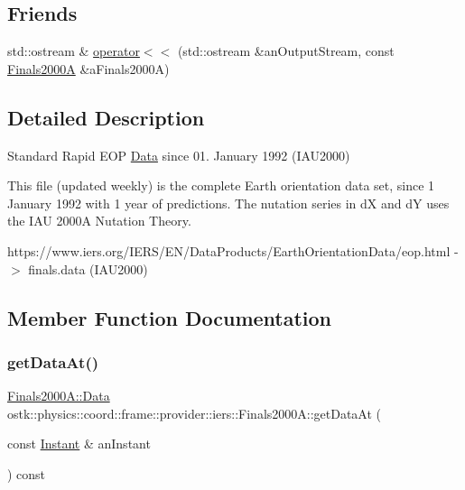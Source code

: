 \subsection*{Friends}
\begin{DoxyCompactItemize}
\item 
std\+::ostream \& \hyperlink{classostk_1_1physics_1_1coord_1_1frame_1_1provider_1_1iers_1_1_finals2000_a_ade92763eb1cb719a4a499af1beb72b43}{operator$<$$<$} (std\+::ostream \&an\+Output\+Stream, const \hyperlink{classostk_1_1physics_1_1coord_1_1frame_1_1provider_1_1iers_1_1_finals2000_a}{Finals2000A} \&a\+Finals2000A)
\end{DoxyCompactItemize}


\subsection{Detailed Description}
Standard Rapid E\+OP \hyperlink{structostk_1_1physics_1_1coord_1_1frame_1_1provider_1_1iers_1_1_finals2000_a_1_1_data}{Data} since 01. January 1992 (I\+A\+U2000) 

This file (updated weekly) is the complete Earth orientation data set, since 1 January 1992 with 1 year of predictions. The nutation series in dX and dY uses the I\+AU 2000A Nutation Theory.

https\+://www.iers.\+org/\+I\+E\+R\+S/\+E\+N/\+Data\+Products/\+Earth\+Orientation\+Data/eop.html -\/$>$ finals.\+data (I\+A\+U2000) 

\subsection{Member Function Documentation}
\mbox{\label{classostk_1_1physics_1_1coord_1_1frame_1_1provider_1_1iers_1_1_finals2000_a_ae945e5caae2390991db7eae67ba34016}} 
\subsubsection{\texorpdfstring{get\+Data\+At()}{getDataAt()}}
{\footnotesize\ttfamily \hyperlink{structostk_1_1physics_1_1coord_1_1frame_1_1provider_1_1iers_1_1_finals2000_a_1_1_data}{Finals2000\+A\+::\+Data} ostk\+::physics\+::coord\+::frame\+::provider\+::iers\+::\+Finals2000\+A\+::get\+Data\+At (\begin{DoxyParamCaption}\item[{const \hyperlink{classostk_1_1physics_1_1time_1_1_instant}{Instant} \&}]{an\+Instant }\end{DoxyParamCaption}) const}

